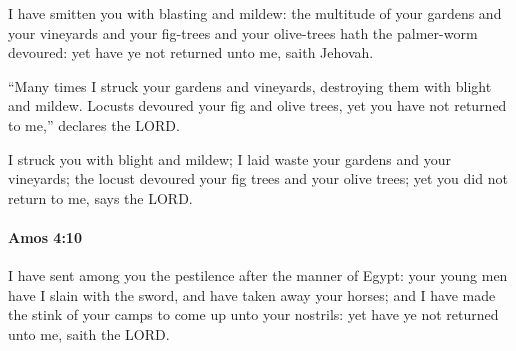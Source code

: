 			\begin{versebox}
					\item[BHS] 
					\item[LXX] 
					\item[ASV] I have smitten you with blasting and mildew: the multitude of your gardens and your vineyards and your fig-trees and your olive-trees hath the palmer-worm devoured: yet have ye not returned unto me, saith Jehovah.
					\item[NIV] “Many times I struck your gardens and vineyards, destroying them with blight and mildew. Locusts devoured your fig and olive trees, yet you have not returned to me,” declares the LORD.
					\item[NRSV] I struck you with blight and mildew; I laid waste your gardens and your vineyards; the locust devoured your fig trees and your olive trees; yet you did not return to me, says the LORD.
			\end{versebox}

		\paragraph{Amos 4:10} %
			\label{AMOS-4-10}

			I have sent among you the pestilence after the manner of Egypt: your young men have I slain with the sword, and have taken away your horses; and I have made the stink of your camps to come up unto your nostrils: yet have ye not returned unto me, saith the LORD.

